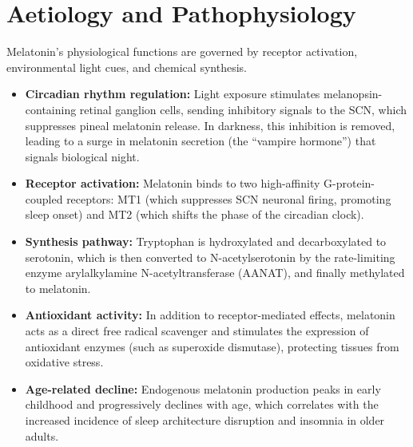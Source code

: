 \section*{Aetiology and Pathophysiology}
Melatonin's physiological functions are governed by receptor activation, environmental light cues, and chemical synthesis.
\begin{itemize}
    \item \textbf{Circadian rhythm regulation:} Light exposure stimulates melanopsin-containing retinal ganglion cells, sending inhibitory signals to the SCN, which suppresses pineal melatonin release. In darkness, this inhibition is removed, leading to a surge in melatonin secretion (the ``vampire hormone'') that signals biological night.
    \item \textbf{Receptor activation:} Melatonin binds to two high-affinity G-protein-coupled receptors: MT1 (which suppresses SCN neuronal firing, promoting sleep onset) and MT2 (which shifts the phase of the circadian clock).
    \item \textbf{Synthesis pathway:} Tryptophan is hydroxylated and decarboxylated to serotonin, which is then converted to N-acetylserotonin by the rate-limiting enzyme arylalkylamine N-acetyltransferase (AANAT), and finally methylated to melatonin.
    \item \textbf{Antioxidant activity:} In addition to receptor-mediated effects, melatonin acts as a direct free radical scavenger and stimulates the expression of antioxidant enzymes (such as superoxide dismutase), protecting tissues from oxidative stress.
    \item \textbf{Age-related decline:} Endogenous melatonin production peaks in early childhood and progressively declines with age, which correlates with the increased incidence of sleep architecture disruption and insomnia in older adults.
\end{itemize}

